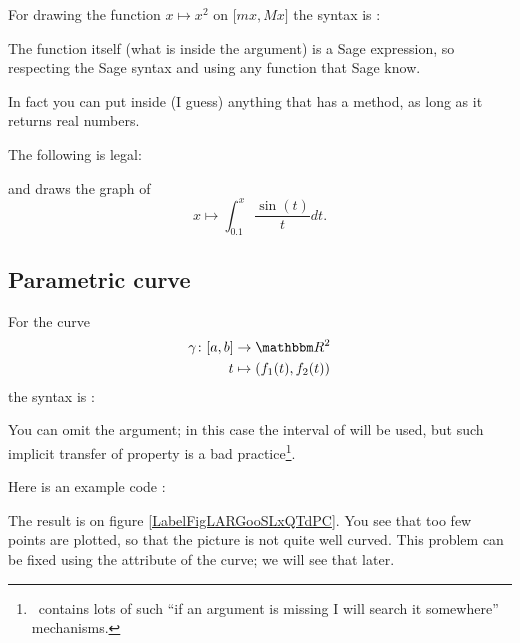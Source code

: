 For drawing the function \( x\mapsto x^2\) on \( \mathopen[ mx , Mx \mathclose]\) the syntax is :



The function itself (what is inside the  argument) is a Sage expression, so respecting the Sage syntax and using any function that Sage know.

In fact you can put inside  (I guess) anything that has a  method, as long as it returns real numbers.

The following is legal:

and draws the graph of
\begin{equation}
    x\mapsto \int_{0.1}^x\frac{ \sin(t) }{ t }dt.
\end{equation}

\subsection{Parametric curve}

For the curve
\begin{equation}
    \begin{aligned}
        \gamma\colon \mathopen[ a , b \mathclose]&\to \eR^2 \\
        t&\mapsto (  f_1(t),f_2(t)  ) 
    \end{aligned}
\end{equation}
the syntax is :


You can omit the  argument; in this case the interval of  will be used, but such implicit transfer of property is a bad practice\footnote{\phystricks\ contains lots of such ``if an argument is missing I will search it somewhere'' mechanisms.}.

Here is an example code :


The result is on figure \ref{LabelFigLARGooSLxQTdPC}. You see that too few points are plotted, so that the picture is not quite well curved. This problem can be fixed using the  attribute of the curve; we will see that later.

\newcommand{\CaptionFigLARGooSLxQTdPC}{This is a parametric curve, a Lyssajou.}


